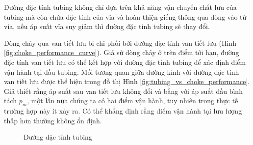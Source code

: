 \documentclass[12pt,a4paper]{report}
\begin{document}
Đường đặc tính tubing không chỉ dựa trên khả năng vận chuyển chất lưu của tubing mà còn chứa đặc tính của vỉa và hoàn thiện giếng thông qua dòng vào từ vỉa, nếu áp suất vỉa suy giảm thì đường đặc tính tubing sẽ thay đổi.

Dòng chảy qua van tiết lưu bị chi phối bởi đường đặc tính van tiết lưu  (Hình \ref{fig:choke_performance_curve}). Giả sử dòng chảy ở trên điểm tới hạn, đường đặc tính van tiết lưu có thể kết hợp với đường đặc tính tubing để xác định điểm vận hành tại đầu tubing. Mối tương quan giữa đường kính với đường đặc tính van tiết lưu được thể hiện trong đồ thị Hình \ref{fig:tubing_vs_choke_performance}. Giả thiết rằng áp suất sau van tiết lưu không đổi và bằng với áp suất đầu bình tách $p_m$, một lần nữa chúng ta có hai điểm vận hành, tuy nhiên trong thực tế trường hợp này ít xảy ra. Có thể khẳng định rằng điểm vận hành tại lưu lượng thấp hơn thường không ổn định.

	\begin{figure}[h]
		\centering
		\hfill
		\hfill
		\caption[Đường đặc tính tubing]{Đường đặc tính tubing \cite{jansen2004modelling}}
	\end{figure}
\end{document}
